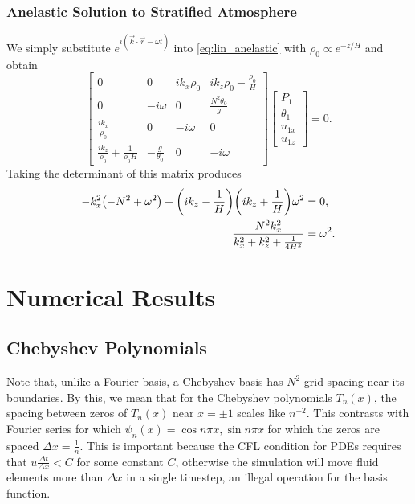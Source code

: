 \documentclass[11pt,
        usenames, %
        dvipsnames %
    ]{report}
\DeclarePairedDelimiter\p{\lparen}{\rparen}
\begin{document}
\subsection{Anelastic Solution to Stratified Atmosphere}

We simply substitute $e^{i(\vec{k} \cdot \vec{r} - \omega t)}$ into
\autoref{eq:lin_anelastic} with $\rho_0 \propto e^{-z/H}$ and obtain
\begin{equation}
    \begin{bmatrix}
        0 & 0 & ik_x\rho_0 & ik_z \rho_0 - \frac{\rho_0}{H}\\
        0 & -i\omega & 0 & \frac{N^2\theta_0}{g}\\
        \frac{ik_x}{\rho_0} & 0 & -i\omega & 0\\
        \frac{ik_z}{\rho_0} + \frac{1}{\rho_0 H} & -\frac{g}{\theta_0}
            & 0 & -i\omega
    \end{bmatrix} \begin{bmatrix}
        P_1 \\ \theta_1 \\ u_{1x} \\ u_{1z}
    \end{bmatrix} = 0.
\end{equation}
Taking the determinant of this matrix produces
\begin{align}
    -k_x^2\p*{-N^2 + \omega^2} + \p*{ik_z - \frac{1}{H}}
        \p*{ik_z + \frac{1}{H}}\omega^2 &= 0,\nonumber\\
    \frac{N^2k_x^2}{k_x^2 + k_z^2 + \frac{1}{4H^2}} &= \omega^2.
\end{align}

\chapter{Numerical Results}

\section{Chebyshev Polynomials}\label{s:chebyshev}

Note that, unlike a Fourier basis, a Chebyshev basis has $N^2$ grid spacing near
its boundaries. By this, we mean that for the Chebyshev polynomials $T_n(x)$,
the spacing between zeros of $T_n(x)$ near $x = \pm 1$ scales like $n^{-2}$.
This contrasts with Fourier series for which $\psi_n(x) = \cos n\pi x, \sin n\pi
x$ for which the zeros are spaced $\Delta x = \frac{1}{n}$. This is important
because the CFL condition for PDEs requires that $u\frac{\Delta t}{\Delta x} <
C$ for some constant $C$, otherwise the simulation will move fluid elements more
than $\Delta x$ in a single timestep, an illegal operation for the basis
function.
\end{document}
